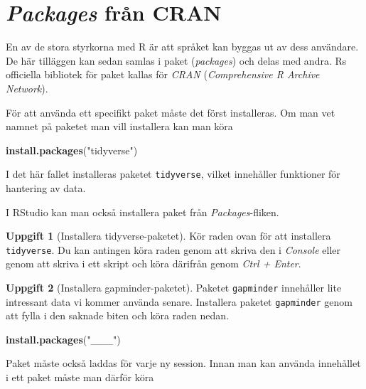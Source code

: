 \documentclass[
]{book}
\newenvironment{Shaded}{\begin{snugshade}}{\end{snugshade}}
\newcommand{\FunctionTok}[1]{\textcolor[rgb]{0.13,0.29,0.53}{\textbf{#1}}}
\newcommand{\NormalTok}[1]{#1}
\newcommand{\StringTok}[1]{\textcolor[rgb]{0.31,0.60,0.02}{#1}}
\theoremstyle{definition}
\theoremstyle{definition}
\theoremstyle{definition}
\newtheorem{exercise}{Uppgift}[chapter]
\theoremstyle{definition}
\theoremstyle{remark}
\begin{document}
\section{\texorpdfstring{\emph{Packages} från CRAN}{Packages från CRAN}}\label{packages-fruxe5n-cran}

En av de stora styrkorna med R är att språket kan byggas ut av dess användare. De här tilläggen kan sedan samlas i paket (\emph{packages}) och delas med andra. Rs officiella bibliotek för paket kallas för \emph{CRAN} (\emph{Comprehensive R Archive Network}).

För att använda ett specifikt paket måste det först installeras. Om man vet namnet på paketet man vill installera kan man köra

\begin{Shaded}
\begin{Highlighting}[]
\FunctionTok{install.packages}\NormalTok{(}\StringTok{"tidyverse"}\NormalTok{)}
\end{Highlighting}
\end{Shaded}

I det här fallet installeras paketet \texttt{tidyverse}, vilket innehåller funktioner för hantering av data.

I RStudio kan man också installera paket från \emph{Packages}-fliken.

\begin{exercise}[Installera tidyverse-paketet]
Kör raden ovan för att installera \texttt{tidyverse}. Du kan antingen köra raden genom att skriva den i \emph{Console} eller genom att skriva i ett skript och köra därifrån genom \emph{Ctrl + Enter}.
\end{exercise}

\begin{exercise}[Installera gapminder-paketet]

Paketet \texttt{gapminder} innehåller lite intressant data vi kommer använda senare. Installera paketet \texttt{gapminder} genom att fylla i den saknade biten och köra raden nedan.

\begin{Shaded}
\begin{Highlighting}[]
\FunctionTok{install.packages}\NormalTok{(}\StringTok{"\_\_\_"}\NormalTok{)}
\end{Highlighting}
\end{Shaded}

\end{exercise}

Paket måste också laddas för varje ny session. Innan man kan använda innehållet i ett paket måste man därför köra
\end{document}
